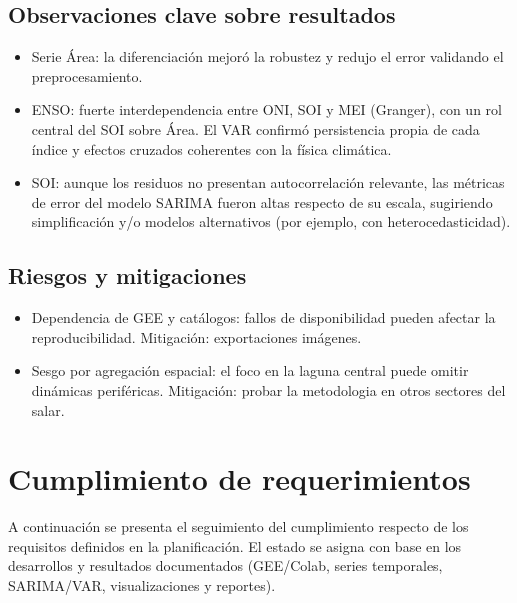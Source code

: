 \subsection{Observaciones clave sobre resultados}
\begin{itemize}
    \item Serie Área: la diferenciación mejoró la robustez y redujo el error validando el preprocesamiento.
    \item ENSO: fuerte interdependencia entre ONI, SOI y MEI (Granger), con un rol central del SOI sobre Área. El VAR confirmó persistencia propia de cada índice y efectos cruzados coherentes con la física climática.
    \item SOI: aunque los residuos no presentan autocorrelación relevante, las métricas de error del modelo SARIMA fueron altas respecto de su escala, sugiriendo simplificación y/o modelos alternativos (por ejemplo, con heterocedasticidad).
\end{itemize}

\subsection{Riesgos y mitigaciones}
\begin{itemize}
    \item Dependencia de GEE y catálogos: fallos de disponibilidad pueden afectar la reproducibilidad. Mitigación: exportaciones imágenes.
    \item Sesgo por agregación espacial: el foco en la laguna central puede omitir dinámicas periféricas. Mitigación: probar la metodologia en otros sectores del salar.
\end{itemize}


\section{Cumplimiento de requerimientos}

A continuación se presenta el seguimiento del cumplimiento respecto de los requisitos definidos en la planificación. El estado se asigna con base en los desarrollos y resultados documentados (GEE/Colab, series temporales, SARIMA/VAR, visualizaciones y reportes).

